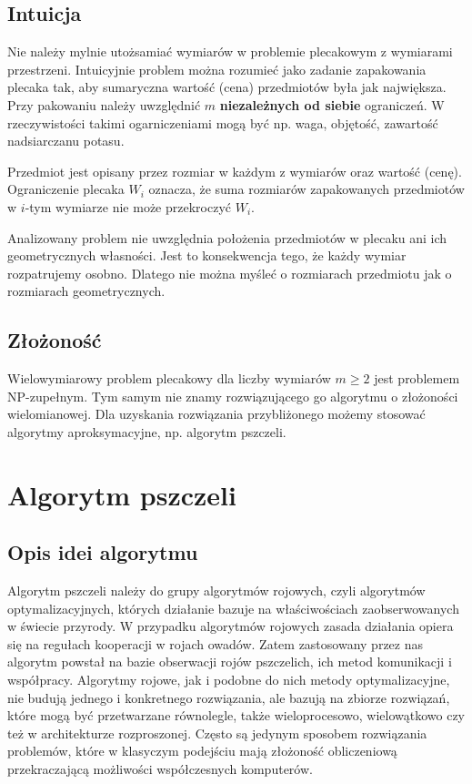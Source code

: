 \documentclass[a4paper,12pt,notitlepage]{mwrep}
\begin{document}
\section{Intuicja}
Nie należy mylnie utożsamiać wymiarów w problemie plecakowym z 
wymiarami przestrzeni. Intuicyjnie problem można rozumieć jako zadanie
zapakowania plecaka tak, aby sumaryczna wartość (cena)
przedmiotów była jak największa.
Przy pakowaniu należy uwzględnić $m$ \textbf{niezależnych od siebie}
ograniczeń. W rzeczywistości takimi ogarniczeniami mogą być np. waga,
objętość, zawartość nadsiarczanu potasu.

Przedmiot jest opisany przez
rozmiar w każdym z wymiarów oraz wartość (cenę). Ograniczenie plecaka
$W_i$ oznacza, że suma rozmiarów zapakowanych przedmiotów w $i$-tym
wymiarze nie może przekroczyć $W_i$.

Analizowany problem nie uwzględnia położenia przedmiotów w plecaku
ani ich geometrycznych własności. Jest to konsekwencja tego, że każdy
wymiar rozpatrujemy osobno. Dlatego nie można myśleć o rozmiarach
przedmiotu jak o rozmiarach geometrycznych.

\section{Złożoność}
Wielowymiarowy problem plecakowy dla liczby wymiarów $m \ge 2$ jest
problemem NP-zupełnym. Tym samym nie znamy rozwiązującego go
algorytmu o złożoności wielomianowej. Dla uzyskania rozwiązania
przybliżonego możemy stosować algorytmy aproksymacyjne, np. algorytm
pszczeli.


\chapter{Algorytm pszczeli}
\section{Opis idei algorytmu}
Algorytm pszczeli należy do grupy algorytmów rojowych, czyli algorytmów optymalizacyjnych, których działanie bazuje na właściwościach zaobserwowanych w świecie przyrody. W przypadku algorytmów rojowych zasada działania opiera się na regułach kooperacji w rojach owadów. Zatem zastosowany przez nas algorytm powstał na bazie obserwacji rojów pszczelich, ich metod komunikacji i współpracy. Algorytmy rojowe, jak i podobne do nich metody optymalizacyjne, nie budują jednego i konkretnego rozwiązania, ale bazują na zbiorze rozwiązań, które mogą być przetwarzane równolegle, także wieloprocesowo, wielowątkowo czy też w architekturze rozproszonej. Często są jedynym sposobem rozwiązania problemów, które w klasyczym podejściu mają złożoność obliczeniową przekraczającą możliwości współczesnych komputerów.
\end{document}
